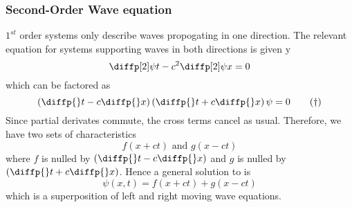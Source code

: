 \documentclass{article}
\begin{document}
\subsubsection{Second-Order Wave equation}
$1^{st}$ order systems only describe waves propogating in one direction.
The relevant equation for systems supporting waves in both directions is given y
\[
    \diffp[2] \psi t - c^2 \diffp[2] \psi x = 0
\]
which can be factored as
\[
    \bkt{\diffp {}t- c \diffp {}x}\bkt{\diffp {}t + c \diffp {}x}\psi = 0 \tagdagger
\]
Since partial derivates commute, the cross terms cancel as usual.
Therefore, we have two sets of characteristics
\[
    f(x + ct) \text{ and } g(x - ct)
\]
where $f$ is nulled by $\bkt{\diffp {}t- c \diffp {}x}$ and $g$ is nulled by $\bkt{\diffp {}t + c \diffp {}x}$.
Hence a general solution to  is
\[
    \psi(x, t) = f(x + ct) + g(x - ct)
\]
which is a superposition of left and right moving wave equations.
\end{document}
